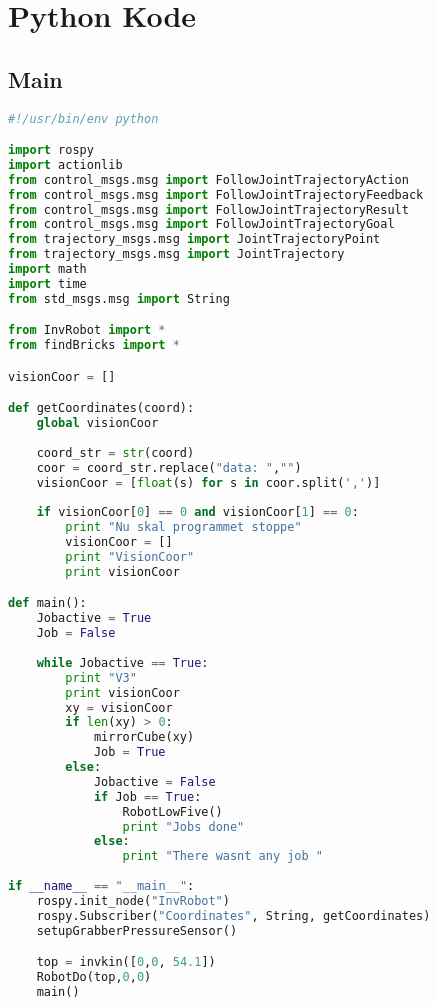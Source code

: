 \chapter{Python Kode}\label{app:PythonKode}
\section{Main}\label{sec:Main}
\begin{lstlisting}[language=Python]
#!/usr/bin/env python

import rospy
import actionlib
from control_msgs.msg import FollowJointTrajectoryAction
from control_msgs.msg import FollowJointTrajectoryFeedback
from control_msgs.msg import FollowJointTrajectoryResult
from control_msgs.msg import FollowJointTrajectoryGoal
from trajectory_msgs.msg import JointTrajectoryPoint
from trajectory_msgs.msg import JointTrajectory
import math
import time
from std_msgs.msg import String

from InvRobot import *
from findBricks import *

visionCoor = []

def getCoordinates(coord):    
    global visionCoor
    
    coord_str = str(coord)
    coor = coord_str.replace("data: ","")
    visionCoor = [float(s) for s in coor.split(',')]
    
    if visionCoor[0] == 0 and visionCoor[1] == 0:
        print "Nu skal programmet stoppe"
        visionCoor = []
        print "VisionCoor"
        print visionCoor

def main():
    Jobactive = True
    Job = False
    
    while Jobactive == True:
        print "V3"
        print visionCoor
        xy = visionCoor
        if len(xy) > 0:
            mirrorCube(xy)
            Job = True
        else:
            Jobactive = False
            if Job == True:
                RobotLowFive()
                print "Jobs done"
            else:
                print "There wasnt any job "
                
if __name__ == "__main__":
    rospy.init_node("InvRobot")
    rospy.Subscriber("Coordinates", String, getCoordinates)
    setupGrabberPressureSensor()

    top = invkin([0,0, 54.1])
    RobotDo(top,0,0)
    main()
\end{lstlisting}
